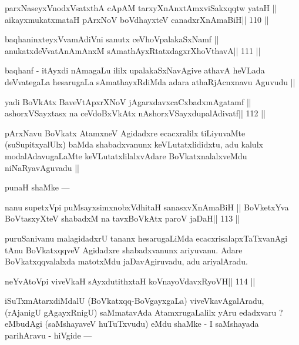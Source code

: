 \begin{shl}
parxNaseyxVnodxVsatxthA cApAM tarxyXnAnxtAmxviSakxqqtw yataH ||
aikayxmukatxmataH pArxNoV boVdhayxteV canadxrXnAmaBiH\hfill || 110 ||
\end{shl}

\begin{shl}
baqhaninxteyxVvamAdiVni sanutx ceVhoVpalakaSxNamf ||
anukatxdeVvatAnAmAnxM sAmathAyxRtatxdagxrXhoV\s thavA\hfill || 111 ||
\end{shl}

\begin{artha}
baqhanf - itAyxdi nAmagaLu ililx upalakaSxNavAgive athavA heVLada deVvategaLa hesarugaLa sAmathayxRdiMda adara athaRjAcnxnavu Aguvudu ||
\end{artha}

\begin{shl}
yadi BoVkAtx BaveVtApxrXNoV jAgarxdavxcaCxbadxmAgatamf ||
ashorxVSayxtasx na ceVdoBxVkAtx nAshorxVSayxdupalAdivatf\hfill || 112 ||
\end{shl}

\begin{artha}
pArxNavu BoVkatx AtamxneV Agidadxre ecacxralilx tiLiyuvaMte (suSupitxyalUlx) baMda shabadxvanunx keVLutatxlididxtu, adu kalulx modalAdavugaLaMte keVLutatxlilalxvAdare BoVkatxnalalxveMdu niNaRyavAguvadu ||
\end{artha}

\begin{artha}
punaH shaMke ---
\end{artha}

\begin{shl}
nanu supetxV\s pi puMsayxsimxnobxVdhitaH sanasxvXnAmaBiH ||
BoVketxYva BoVtasxyXteV shabadxM na tavxBoVkAtx paroV jaDaH\hfill || 113 ||
\end{shl}

\begin{artha}
puruSanivanu malagidadxrU tananx hesarugaLiMda ecacxrisalapxTaTxvanAgi tAnu BoVkatxqqveV Agidadxre shabadxvanunx ariyuvanu. Adare BoVkatxqqvalalxda matotxMdu jaDavAgiruvadu, adu ariyalAradu.
\end{artha}

\begin{shl}
neYvAtoV\s pi viveVkaH sAyxdutithxtaH koV\s nayoVdavxRyoVH\hfill || 114 ||
\end{shl}

\begin{artha}
iSuTxmAtarxdiMdalU (BoVkatxqq-BoVgayxgaLa) viveVkavAgalAradu, (rAjanigU gAgayxRnigU) saMmatavAda AtamxrugaLalilx yAru edadxvaru ? eMbudAgi (saMshayaveV huTuTxvudu) eMdu shaMke - I saMshayada parihAravu - hiVgide ---
\end{artha}

